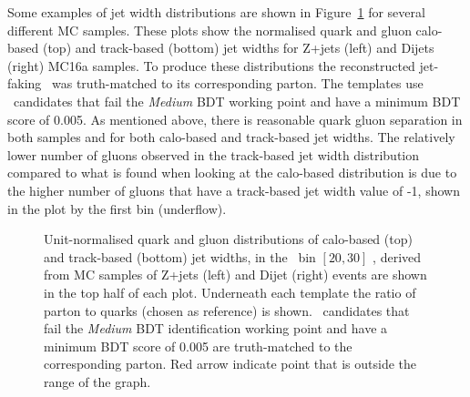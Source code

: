Some examples of jet width distributions are shown in Figure~\ref{fig:jet_width_diff} for several different \ac{MC} samples. These plots show the normalised quark and gluon calo-based (top) and track-based (bottom) jet widths for Z+jets (left) and Dijets (right) MC16a samples. 
To produce these distributions the reconstructed jet-faking \htau\ was truth-matched to its corresponding parton.
The templates use \htau\ candidates that fail the \textit{Medium} \ac{BDT} working point and have a minimum \ac{BDT} score of 0.005. 
As mentioned above, there is reasonable quark gluon separation in both samples and for both calo-based and track-based jet widths. 
The relatively lower number of gluons observed in the track-based jet width distribution compared to what is found when looking at the calo-based distribution is due to the higher number of gluons that have a track-based jet width value of -1, shown in the plot by the first bin (underflow).
	 \begin{figure}[!htb]
	\begin{center}
			 				\hspace{0.05\textwidth}
							\hspace{0.05\textwidth}
							\hspace{0.05\textwidth}
							\hspace{0.05\textwidth}
	\end{center}	
	\caption{Unit-normalised quark and gluon distributions of calo-based (top) and track-based (bottom) jet widths, in the \pt\ bin $[20,30]$ \gev, derived from \ac{MC} samples of Z+jets (left) and Dijet (right) events are shown in the top half of each plot. Underneath each template the ratio of parton to quarks (chosen as reference) is shown.  \htau\ candidates that fail the \textit{Medium} \ac{BDT} identification working point and have a minimum \ac{BDT} score of 0.005 are truth-matched to the corresponding parton. Red arrow indicate point that is outside the range of the graph.}
	\label{fig:jet_width_diff}
	\end{figure}	
	
